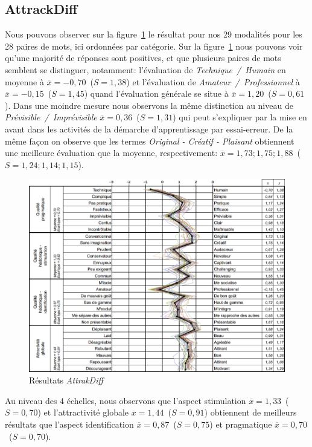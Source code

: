     \subsection{AttrackDiff}
        Nous pouvons observer sur la figure~\ref{fig:attrakdiff_chemin} le résultat pour nos 29 modalités pour les 28 paires de mots, ici ordonnées par catégorie.
        Sur la figure~\ref{fig:attrakdiff_chemin} nous pouvons voir qu'une majorité de réponses sont positives, et que plusieurs paires de mots semblent se distinguer, notamment:
        l'évaluation de \textit{Technique~/~Humain} en moyenne à $\overline{x}=-0,70$~($S= 1,38$) et l'évaluation de \textit{Amateur~/~Professionnel} à $\overline{x}=-0,15$~($S=1,45$) quand l'évaluation générale se situe à $\overline{x}=1,20$~($S=0,61$).
        Dans une moindre mesure nous observons la même distinction au niveau de \textit{Prévisible~/~Imprévisible} $\overline{x}=0,36$~($S=1,31$) qui peut s'expliquer par la mise en avant dans les activités de la démarche d'apprentissage par essai-erreur.
        De la même façon on observe que les termes \textit{Original - Créatif - Plaisant} obtiennent une meilleure évaluation que la moyenne, respectivement: $\overline{x}= 1,73; 1,75; 1,88$~($S= 1,24; 1,14; 1,15$).
        \begin{figure}[!h]
            \centering
            \includegraphics[width=0.9\linewidth]{Figures/Desprez_didapro-attrakdiff_chemin.png}
            \caption{Résultats \textit{AttrakDiff}~}\label{fig:attrakdiff_chemin}
        \end{figure}\par%
        Au niveau des 4 échelles, nous observons que l'aspect stimulation $\overline{x}=1,33$~($S=0,70$) et l'attractivité globale $\overline{x}=1,44$~($S=0,91$) obtiennent de meilleurs résultats que l'aspect identification $\overline{x}=0,87$~($S=0,75$) et pragmatique $\overline{x}=0,70$~($S=0,70$).
